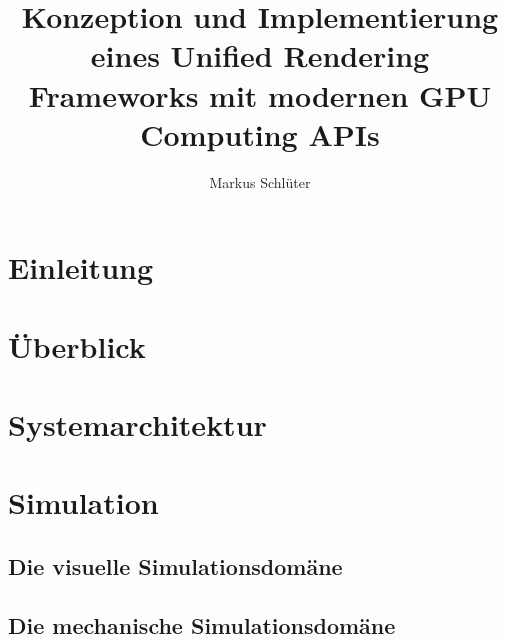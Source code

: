 \documentclass[m,twoside,intern,palatino]{cgBA}
\begin{document}
\author{Markus Schl{\"u}ter}
\title{Konzeption und Implementierung eines Unified Rendering Frameworks mit modernen GPU Computing APIs}








\maketitle
\clearpage 




\listoftodos		%
\tableofcontents
\clearpage         	%
\listoffigures   %
\listoftables
\clearpage








\section{Einleitung}
	
	
\section{Überblick}
	

\section{Systemarchitektur}
	
	
\section{Simulation}
	\label{sec:simulation}
	\subsection{Die visuelle Simulationsdomäne}
			
	\subsection{Die mechanische Simulationsdomäne}
		
\end{document}
